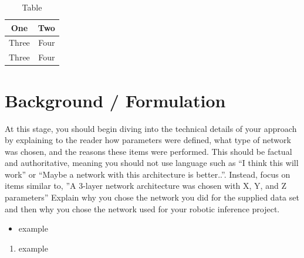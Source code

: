 \documentclass[10pt,journal,compsoc]{IEEEtran}
\begin{document}
\begin{table}[h]
\caption{Table}
\label{table_example}
\begin{center}
\begin{tabular}{|c||c|}
\hline
One & Two\\
\hline
Three & Four\\
\hline
Three & Four\\
\hline
\end{tabular}
\end{center}
\end{table}



   

\section{Background / Formulation}
At this stage, you should begin diving into the technical details of your approach by explaining to the reader how parameters were defined, what type of network was chosen, and the reasons these items were performed. This should be factual and authoritative, meaning you should not use language such as “I think this will work” or “Maybe a network with this architecture is better..”. Instead, focus on items similar to, ”A 3-layer network architecture was chosen with X, Y, and Z parameters” 
Explain why you chose the network you did for the supplied data set and then why you chose the network used for your robotic inference project. \cite{lamport1994latex}


\begin{itemize}
\item example
\end {itemize}



\begin{enumerate}
\item example

\end{enumerate}
\end{document}

